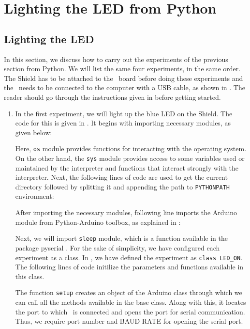 \section{Lighting the LED from Python}
\subsection{Lighting the LED}
\label{sec:light-py}
In this section, we discuss how to carry out the experiments of the
previous section from Python.  We will list the same four experiments,
in the same order.  The Shield has to be attached to the \arduino\ board
before doing these experiments and the \arduino\ needs to be connected to the computer 
with a USB cable, as shown in .
The reader should go through the instructions given in
 before getting started.
\begin{enumerate}
  \item In the first experiment, we will light up the blue LED on the
    Shield.  The code for this is given in . It begins with importing 
    necessary modules, as given below: 
    

    Here, {\tt os} module provides functions for interacting with the operating system. On the 
    other hand, the {\tt sys} module provides access to some variables used or maintained by the interpreter
    and functions that interact strongly with the interpreter. Next, the following lines of code are used to get the current directory 
    followed by splitting it and appending the path to {\tt PYTHONPATH} environment: 
    
    
    After importing the necessary modules, following line imports the Arduino module from Python-Arduino
    toolbox, as explained in :
    

    Next, we will import {\tt sleep} module, which is a function available in the package pyserial \cite{pySerial}.
    For the sake of simplicity, we have configured each experiment as a class. In ,
    we have defined the experiment as {\tt class LED\_ON}. The following lines of code 
    initilize the parameters and functions available in this class. 
    

    The function {\tt setup} creates an object of the Arduino class
    through which we can call all the methods available in the base class. 
    Along with this, it locates the port to which \arduino\ is connected 
    and opens the port for serial communication. 
    Thus, we require port number and BAUD RATE for opening the serial port. 
        

\end{enumerate}
